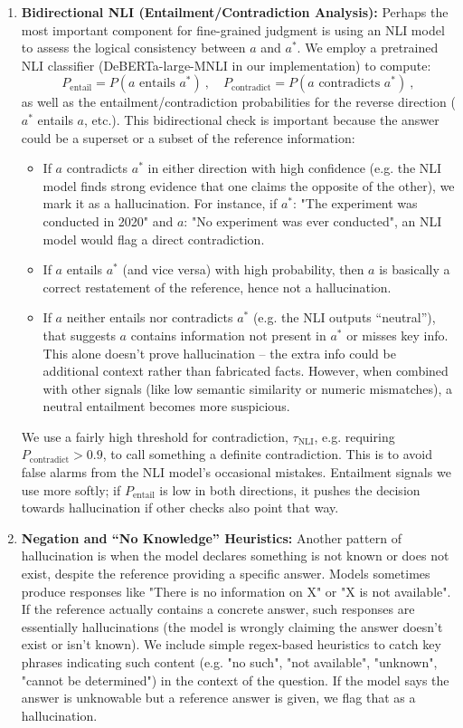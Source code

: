 \documentclass{article}
\begin{document}
\begin{enumerate}
    \item \textbf{Bidirectional NLI (Entailment/Contradiction Analysis):} Perhaps the most important component for fine-grained judgment is using an NLI model to assess the logical consistency between $a$ and $a^*$. We employ a pretrained NLI classifier (DeBERTa-large-MNLI in our implementation) to compute:
    \[
    P_{\text{entail}} = P(a \text{ entails } a^*)~, \quad 
    P_{\text{contradict}} = P(a \text{ contradicts } a^*)~,
    \] 
    as well as the entailment/contradiction probabilities for the reverse direction ($a^*$ entails $a$, etc.). This bidirectional check is important because the answer could be a superset or a subset of the reference information:
    \begin{itemize}
        \item If $a$ contradicts $a^*$ in either direction with high confidence (e.g. the NLI model finds strong evidence that one claims the opposite of the other), we mark it as a hallucination. For instance, if $a^*$: "The experiment was conducted in 2020" and $a$: "No experiment was ever conducted", an NLI model would flag a direct contradiction.
        \item If $a$ entails $a^*$ (and vice versa) with high probability, then $a$ is basically a correct restatement of the reference, hence not a hallucination.
        \item If $a$ neither entails nor contradicts $a^*$ (e.g. the NLI outputs “neutral”), that suggests $a$ contains information not present in $a^*$ or misses key info. This alone doesn’t prove hallucination -- the extra info could be additional context rather than fabricated facts. However, when combined with other signals (like low semantic similarity or numeric mismatches), a neutral entailment becomes more suspicious.
    \end{itemize}
    We use a fairly high threshold for contradiction, $\tau_{\text{NLI}}$, e.g. requiring $P_{\text{contradict}} > 0.9$, to call something a definite contradiction. This is to avoid false alarms from the NLI model’s occasional mistakes. Entailment signals we use more softly; if $P_{\text{entail}}$ is low in both directions, it pushes the decision towards hallucination if other checks also point that way.
    
    \item \textbf{Negation and “No Knowledge” Heuristics:} Another pattern of hallucination is when the model declares something is not known or does not exist, despite the reference providing a specific answer. Models sometimes produce responses like "There is no information on X" or "X is not available". If the reference actually contains a concrete answer, such responses are essentially hallucinations (the model is wrongly claiming the answer doesn't exist or isn't known). We include simple regex-based heuristics to catch key phrases indicating such content (e.g. "no such", "not available", "unknown", "cannot be determined") in the context of the question. If the model says the answer is unknowable but a reference answer is given, we flag that as a hallucination.
    

\end{enumerate}
\end{document}

